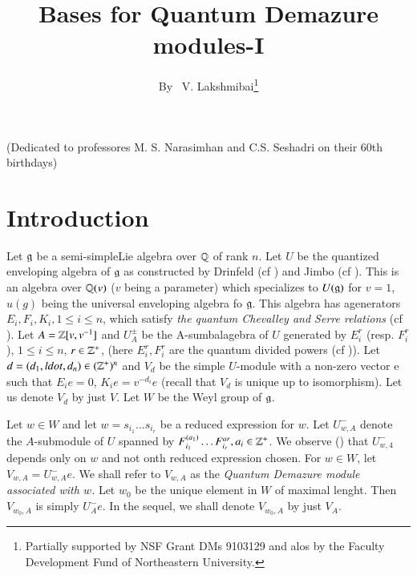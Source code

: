 \title{Bases for Quantum Demazure modules-I}

\author{By~ V. Lakshmibai\footnote{Partially supported by NSF Grant DMs 9103129 and alos by the Faculty Development Fund of Northeastern University.}}

\date{}
\maketitle

\begin{center}
(Dedicated to professores M. S. Narasimhan and C.S. Seshadri on their 60th birthdays)
\end{center}

\section{Introduction}\label{art9-sec-1}
Let $\mathfrak{g}$ be a semi-simple\pageoriginale Lie algebra over $\mathbb{Q}$ of rank $n$. Let $U$ be the quantized enveloping algebra of $\mathfrak{g}$ as constructed by Drinfeld (cf \cite{art9-keyD}) and Jimbo (cf \cite{art9-keyJ}). This is an algebra over $\mathbb{Q}(v)$ ($v$ being a parameter)  which specializes to $U(\mathfrak{g})$ for $v=1$, $u(g)$ being the universal enveloping algebra fo $\mathfrak{g}$. This algebra has agenerators $E_{i}, F_{i}, K_{i}, 1\leq i \leq n$, which satisfy \textit{the quantum Chevalley and Serre relations} (cf \cite{art9-keyL1}). Let $A= \mathbb{Z}[v, v^{-1}] $ and $U_{A}^{\pm}$ be the A-sumbalagebra of $U$ generated by $E_{i}^{r}$ (resp. $F_{i}^{r}$), $1\leq i \leq n$, $r \in \mathbb{Z}^{+}$, (here $E_{i}^{r}, F_{i}^{r}$ are the quantum divided powers (cf \cite{art9-keyJ})). Let $d=(d_{1}, ldot, d_{n}) \in (\mathbb{Z}^{+})^{n}$ and $V_{d}$ be the simple $U$-module with a non-zero vector e such that $E_{i}e=0$, $K_{i}e =v^{-d_{i}}e$ (recall that $V_{d}$ is unique up to isomorphism). Let us denote $V_{d}$ by just $V$. Let $W$ be the Weyl group of $\mathfrak{g}$.

Let $w \in W$ and let $w=s_{i_{1}}\ldots s_{i_{r}}$ be a reduced expression for $w$. Let $U_{w,A}^{-}$ denote the $A$-submodule of $U$ spanned by $F_{i_{1}}^{(a_{1})}\ldots F_{i_{r}}^{ar}, a_{i}\in \mathbb{Z}^{+}$. We observe (\cite{art9-keyL4}) that $U_{w,4}^{-}$ depends only on $w$ and not onth reduced expression chosen. For $w\in W$, let $V_{w,A}=U_{w,A}^{-}e$. We shall refer to $V_{w, A}$ as the \textit{Quantum Demazure module associated with $w$.} Let $w_{0}$ be the unique element in $W$ of maximal lenght. Then $V_{w_{0},A}$ is simply $U_{A}^{-}e$. In the sequel, we shall denote $V_{w_{0}, A}$ by just $V_{A}$.

